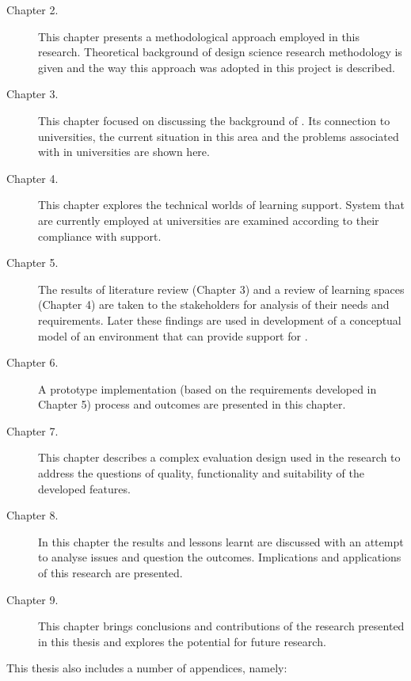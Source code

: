 \begin{description}
\item[Chapter 2.] This chapter presents a methodological approach employed in
this research. Theoretical background of design science research methodology is
given and the way this approach was adopted in this project is described.
\item[Chapter 3.] This chapter focused on discussing the background of \LLLsn.
Its connection to universities, the current situation in this area and the
problems associated with \LLLs in universities are shown here.
\item[Chapter 4.] This chapter explores the technical worlds of learning
support. System that are currently employed at universities are examined according
to their compliance with \LLLs support.
\item[Chapter 5.] The results of literature review (Chapter 3) and a review of
learning spaces (Chapter 4) are taken to the stakeholders for analysis of their
needs and requirements. Later these findings are used in development of a
conceptual model of an environment that can provide support for \LLLsn.
\item[Chapter 6.] A prototype implementation (based on the requirements
developed in Chapter 5) process and outcomes are presented in this chapter.
\item[Chapter 7.] This chapter describes a complex evaluation design used in the
research to address the questions of quality, functionality and suitability of
the developed features.
\item[Chapter 8.] In this chapter the results and lessons learnt are discussed
with an attempt to analyse issues and question the outcomes. Implications and
applications of this research are presented.
\item[Chapter 9.] This chapter brings conclusions and contributions of the
research presented in this thesis and explores the potential for future research.
\end{description}

This thesis also includes a number of appendices, namely:

